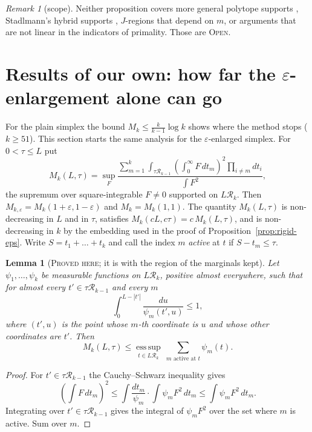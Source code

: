 \documentclass[11pt]{amsart}
\newtheorem{lemma}[theorem]{Lemma}
\theoremstyle{definition}
\theoremstyle{remark}
\newtheorem{remark}[theorem]{Remark}
\newcommand{\lbl}[1]{\textup{\textsc{#1}}}
\newcommand{\R}{\mathcal{R}}
\begin{document}
\begin{remark}[scope]
Neither proposition covers more general polytope supports
\cite[\S3]{Pol14b}, Stadlmann's hybrid supports \cite{Sta26}, $J$-regions
that depend on $m$, or arguments that are not linear in the indicators of
primality. Those are \lbl{Open}.
\end{remark}

\section{Results of our own: how far the \texorpdfstring{$\varepsilon$}{epsilon}-enlargement alone can go}\label{sec:epsfloor}

For the plain simplex the bound $M_k\le\frac{k}{k-1}\log k$ shows where the
method stops ($k\ge51$). This section starts the same analysis for the
$\varepsilon$-enlarged simplex. For $0<\tau\le L$ put
\[
M_k(L,\tau)=\sup_F\frac{\sum_{m=1}^k\int_{\tau\R_{k-1}}\left(\int_0^\infty F\,dt_m\right)^2\prod_{i\ne m}dt_i}{\int F^2},
\]
the supremum over square-integrable $F\ne0$ supported on $L\R_k$. Then
$M_{k,\varepsilon}=M_k(1+\varepsilon,1-\varepsilon)$ and $M_k=M_k(1,1)$. The
quantity $M_k(L,\tau)$ is non-decreasing in $L$ and in $\tau$, satisfies
$M_k(cL,c\tau)=c\,M_k(L,\tau)$, and is non-decreasing in $k$ by the embedding
used in the proof of Proposition~\ref{prop:rigid-eps}. Write
$S=t_1+\dots+t_k$ and call the index $m$ \emph{active} at $t$ if
$S-t_m\le\tau$.

\begin{lemma}[\lbl{Proved here}; it is {\cite[Lemma~6.1]{Pol14b}} with the region of the marginals kept]\label{lem:dual}
Let $\psi_1,\dots,\psi_k$ be measurable functions on $L\R_k$, positive almost
everywhere, such that for almost every $t'\in\tau\R_{k-1}$ and every $m$
\[
\int_0^{L-|t'|}\frac{du}{\psi_m(t',u)}\le1,
\]
where $(t',u)$ is the point whose $m$-th coordinate is $u$ and whose other
coordinates are $t'$. Then
\[
M_k(L,\tau)\le\operatorname*{ess\,sup}_{t\in L\R_k}\ \sum_{m\text{ active at }t}\psi_m(t).
\]
\end{lemma}

\begin{proof}
For $t'\in\tau\R_{k-1}$ the Cauchy--Schwarz inequality gives
\[
\left(\int F\,dt_m\right)^2\le\int\frac{dt_m}{\psi_m}\cdot\int\psi_mF^2\,dt_m\le\int\psi_mF^2\,dt_m .
\]
Integrating over $t'\in\tau\R_{k-1}$ gives the integral of $\psi_mF^2$ over
the set where $m$ is active. Sum over $m$.
\end{proof}
\end{document}
